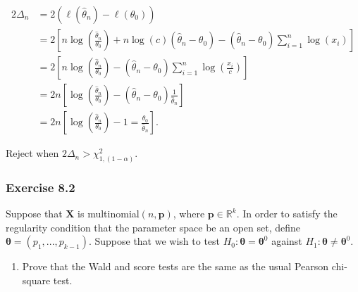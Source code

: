 \documentclass[12pt,]{article}
\providecommand{\tightlist}{%
  \setlength{\itemsep}{0pt}\setlength{\parskip}{0pt}}
\begin{document}
\begin{align*}
2\Delta_n&=2\left(\ell(\hat\theta_n)-\ell(\theta_0)\right)\\
&=2\left[n\log\left(\frac{\hat\theta_n}{\theta_0}\right)+n\log(c)(\hat\theta_n-\theta_0)-(\hat\theta_n-\theta_0)\sum_{i=1}^n\log(x_i)\right]\\
&=2\left[n\log\left(\frac{\hat\theta_n}{\theta_0}\right)-(\hat\theta_n-\theta_0)\sum_{i=1}^n\log\left(\frac{x_i}{c}\right)\right]\\
&=2n\left[\log\left(\frac{\hat\theta_n}{\theta_0}\right)-(\hat\theta_n-\theta_0)\frac{1}{\hat\theta_n}\right]\\
&=2n\left[\log\left(\frac{\hat\theta_n}{\theta_0}\right)-1=\frac{\theta_0}{\hat\theta_n}\right].
\end{align*}

Reject when \(2\Delta_n > \chi^2_{1,(1-\alpha)}.\)

\hypertarget{exercise-8.2}{%
\subsubsection{Exercise 8.2}\label{exercise-8.2}}

Suppose that \(\boldsymbol{X}\) is multinomial\((n,\boldsymbol{p})\),
where \(\boldsymbol{p}\in\mathbb{R}^k\). In order to satisfy the
regularity condition that the parameter space be an open set, define
\(\boldsymbol\theta=(p_1,...,p_{k-1})\). Suppose that we wish to test
\(H_0:\boldsymbol\theta=\boldsymbol\theta^0\) against
\(H_1:\boldsymbol\theta\ne\boldsymbol\theta^0.\)

\begin{enumerate}
\def\labelenumi{(\alph{enumi})}
\tightlist
\item
  Prove that the Wald and score tests are the same as the usual Pearson
  chi-square test.
\end{enumerate}
\end{document}

